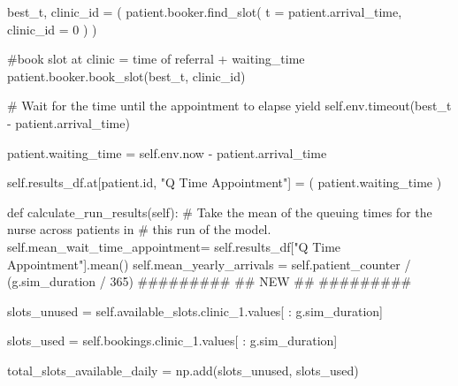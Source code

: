 \documentclass[
  letterpaper,
  DIV=11,
  numbers=noendperiod]{scrreprt}
\newenvironment{Shaded}{\begin{snugshade}}{\end{snugshade}}
\newcommand{\BuiltInTok}[1]{\textcolor[rgb]{0.00,0.23,0.31}{#1}}
\newcommand{\CommentTok}[1]{\textcolor[rgb]{0.37,0.37,0.37}{#1}}
\newcommand{\ControlFlowTok}[1]{\textcolor[rgb]{0.00,0.23,0.31}{#1}}
\newcommand{\DecValTok}[1]{\textcolor[rgb]{0.68,0.00,0.00}{#1}}
\newcommand{\KeywordTok}[1]{\textcolor[rgb]{0.00,0.23,0.31}{#1}}
\newcommand{\NormalTok}[1]{\textcolor[rgb]{0.00,0.23,0.31}{#1}}
\newcommand{\OperatorTok}[1]{\textcolor[rgb]{0.37,0.37,0.37}{#1}}
\newcommand{\StringTok}[1]{\textcolor[rgb]{0.13,0.47,0.30}{#1}}
\newcommand{\VariableTok}[1]{\textcolor[rgb]{0.07,0.07,0.07}{#1}}
\newcommand*\circled[1]{\tikz[baseline=(char.base)]{
          \node[shape=circle,draw,inner sep=1pt] (char) {{\scriptsize#1}};}}
\begin{document}
\begin{Shaded}
\begin{Highlighting}[]
\NormalTok{        best\_t, clinic\_id }\OperatorTok{=}\NormalTok{ (}
\NormalTok{                patient.booker.find\_slot(}
\NormalTok{                  t }\OperatorTok{=}\NormalTok{ patient.arrival\_time, }\hspace*{\fill}\NormalTok{\circled{1}}
\NormalTok{                  clinic\_id }\OperatorTok{=} \DecValTok{0} \hspace*{\fill}\NormalTok{\circled{2}}
\NormalTok{                  )}
\NormalTok{        )}

        \CommentTok{\#book slot at clinic = time of referral + waiting\_time}
\NormalTok{        patient.booker.book\_slot(best\_t, clinic\_id)}

        \CommentTok{\# Wait for the time until the appointment to elapse}
        \ControlFlowTok{yield} \VariableTok{self}\NormalTok{.env.timeout(best\_t }\OperatorTok{{-}}\NormalTok{ patient.arrival\_time)}

\NormalTok{        patient.waiting\_time }\OperatorTok{=} \VariableTok{self}\NormalTok{.env.now }\OperatorTok{{-}}\NormalTok{ patient.arrival\_time}

        \VariableTok{self}\NormalTok{.results\_df.at[patient.}\BuiltInTok{id}\NormalTok{, }\StringTok{"Q Time Appointment"}\NormalTok{] }\OperatorTok{=}\NormalTok{ (}
\NormalTok{                  patient.waiting\_time}
\NormalTok{                  )}

    \KeywordTok{def}\NormalTok{ calculate\_run\_results(}\VariableTok{self}\NormalTok{):}
        \CommentTok{\# Take the mean of the queuing times for the nurse across patients in}
        \CommentTok{\# this run of the model.}
        \VariableTok{self}\NormalTok{.mean\_wait\_time\_appointment}\OperatorTok{=} \VariableTok{self}\NormalTok{.results\_df[}\StringTok{"Q Time Appointment"}\NormalTok{].mean()}
        \VariableTok{self}\NormalTok{.mean\_yearly\_arrivals }\OperatorTok{=} \VariableTok{self}\NormalTok{.patient\_counter }\OperatorTok{/}\NormalTok{ (g.sim\_duration }\OperatorTok{/} \DecValTok{365}\NormalTok{)}
        \CommentTok{\#\#\#\#\#\#\#\#\#}
        \CommentTok{\#\# NEW \#\#}
        \CommentTok{\#\#\#\#\#\#\#\#\#}

\NormalTok{        slots\_unused }\OperatorTok{=} \VariableTok{self}\NormalTok{.available\_slots.clinic\_1.values[ : g.sim\_duration]}

\NormalTok{        slots\_used }\OperatorTok{=} \VariableTok{self}\NormalTok{.bookings.clinic\_1.values[ : g.sim\_duration]}

\NormalTok{        total\_slots\_available\_daily }\OperatorTok{=}\NormalTok{ np.add(slots\_unused, slots\_used)}


\end{Highlighting}
\end{Shaded}
\end{document}
